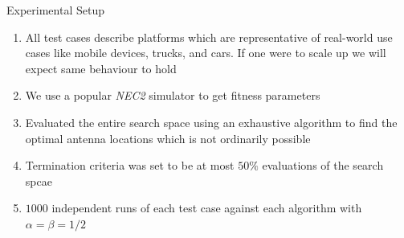 \documentclass{beamer}
\begin{document}
\begin{frame}{Experimental Setup}
\begin{enumerate}\itemsep1.2em
        \item All test cases describe platforms which are representative of real-world use cases like mobile devices, trucks, and cars. If one were to scale up we will expect same behaviour to hold
        \item We use a popular \textit{NEC2} simulator to get fitness parameters 
        \item Evaluated the entire search space using an exhaustive algorithm to find the optimal antenna locations which is not ordinarily possible
        \item Termination criteria was set to be at most $50\%$ evaluations of the search spcae
        \item $1000$ independent runs of each test case against each algorithm with $\alpha = \beta = 1/2$
    \end{enumerate}
    \vspace{10mm}
\end{frame}
\end{document}
